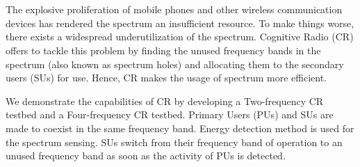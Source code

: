 \chapter*{}
The explosive proliferation of mobile phones and other wireless communication
devices has rendered the spectrum an insufficient resource. To make things
worse, there exists a widespread underutilization of the spectrum. Cognitive
Radio (CR) offers to tackle this problem by finding the unused frequency bands
in the spectrum (also known as spectrum holes) and allocating them to the
secondary users (SUs) for use. Hence, CR makes the usage of spectrum more
efficient.

We demonstrate the capabilities of CR by developing a Two-frequency CR testbed
and a Four-frequency CR testbed. Primary Users (PUs) and SUs are made to
coexist in the same frequency band. Energy detection method is used for the
spectrum sensing. SUs switch from their frequency band of operation to an
unused frequency band as soon as the activity of PUs is detected.